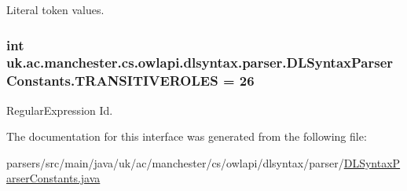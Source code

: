 Literal token values. \hypertarget{interfaceuk_1_1ac_1_1manchester_1_1cs_1_1owlapi_1_1dlsyntax_1_1parser_1_1_d_l_syntax_parser_constants_adec6ebde5b7a75c188a2e9814343a961}{
\subsubsection[{T\-R\-A\-N\-S\-I\-T\-I\-V\-E\-R\-O\-L\-E\-S}]{\setlength{\rightskip}{0pt plus 5cm}int uk.\-ac.\-manchester.\-cs.\-owlapi.\-dlsyntax.\-parser.\-D\-L\-Syntax\-Parser\-Constants.\-T\-R\-A\-N\-S\-I\-T\-I\-V\-E\-R\-O\-L\-E\-S = 26}}\label{interfaceuk_1_1ac_1_1manchester_1_1cs_1_1owlapi_1_1dlsyntax_1_1parser_1_1_d_l_syntax_parser_constants_adec6ebde5b7a75c188a2e9814343a961}
Regular\-Expression Id. 

The documentation for this interface was generated from the following file\-:\begin{DoxyCompactItemize}
\item 
parsers/src/main/java/uk/ac/manchester/cs/owlapi/dlsyntax/parser/\hyperlink{_d_l_syntax_parser_constants_8java}{D\-L\-Syntax\-Parser\-Constants.\-java}\end{DoxyCompactItemize}
